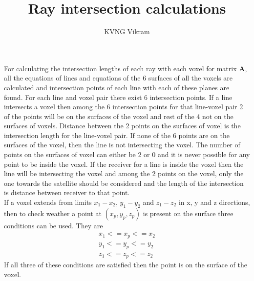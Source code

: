 \documentclass[12pt,a4paper]{article}
\title{Ray intersection calculations}
\author{KVNG Vikram}
\date{}
\begin{document}
\maketitle

For calculating the intersection lengths of each ray with each voxel for matrix $\bm A$, all the equations of lines and equations of the 6 surfaces of all the voxels are calculated and intersection points of each line with each of these planes are found. For each line and voxel pair there exist 6 intersection points. If a line intersects a voxel then among the 6 intersection points for that line-voxel pair 2 of the points will be on the surfaces of the voxel and rest of the 4 not on the surfaces of voxels. Distance between the 2 points on the surfaces of voxel is the intersection length for the line-voxel pair. If none of the 6 points are on the surfaces of the voxel, then the line is not intersecting the voxel. The number of points on the surfaces of voxel can either be 2 or 0 and it is never possible for any point to be inside the voxel. If the receiver for a line is inside the voxel then the line will be intersecting the voxel and among the 2 points on the voxel, only the one towards the satellite should be considered and the length of the intersection is distance between receiver to that point.  \\

If a voxel extends from limits $x_1-x_2$, $y_1-y_2$ and $z_1-z_2$ in x, y and z directions, then to check weather a point at $(x_p,y_p,z_p)$ is present on the surface three conditions can be used. They are
\begin{equation} \label{eq:ideal_intersection_conditions}
	\begin{aligned}
	x_1 <= x_p <= x_2 \\
	y_1 <= y_p <= y_2 \\
	z_1 <= z_p <= z_2
	\end{aligned}
\end{equation}
If all three of these conditions are satisfied then the point is on the surface of the voxel. \\
\end{document}
